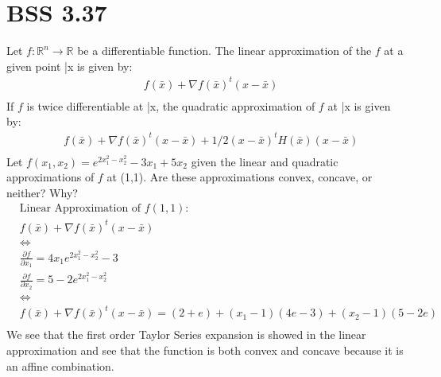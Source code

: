 \documentclass[12pt]{article}
\newcommand{\R}{\mathbb{R}}
\begin{document}
\section{BSS 3.37}
Let $f: \R^n \longrightarrow \R$ be a differentiable function. The linear approximation of the $f$ at a given point \bar x is given by:\\ 
    \begin{align*}
        &f(\bar x) + \nabla f(\bar x)^t (x-\bar x)\\ 
    \end{align*}
If $f$ is twice differentiable at \bar x, the quadratic approximation of $f$ at \bar x is given by:\\
    \begin{align*}
        &f(\bar x) + \nabla f(\bar x)^t (x-\bar x) + 1/2 (x-\bar x)^t H(\bar x) (x-\bar x)\\ 
    \end{align*}
Let $f(x_1, x_2) = e^{2x_1^2 - x_2^2} - 3x_1 + 5x_2$ given the linear and quadratic approximations of $f$ at (1,1). Are these approximations convex, concave, or neither? Why?\\ 
    \begin{align*}
        &\text{Linear Approximation of }f(1,1): \\
        &f(\bar x) + \nabla f(\bar x)^t (x-\bar x)\\
        &\Leftrightarrow\\
        &\frac{\partial f}{\partial x_1 } = 4x_1 e^{2x_1^2 -x_2^2} - 3\\
        &\frac{\partial f}{\partial x_2 } = 5 -2e^{2x_1^2 -x_2^2}\\
        &\Leftrightarrow\\
        &f(\bar x) + \nabla f(\bar x)^t (x-\bar x) = (2+e)+ (x_1 -1) (4e -3) + (x_2 -1 ) (5-2e)\\
    \end{align*}
We see that the first order Taylor Series expansion is showed in the linear approximation and see that the function is both convex and concave because it is an affine combination.\\
\end{document}
